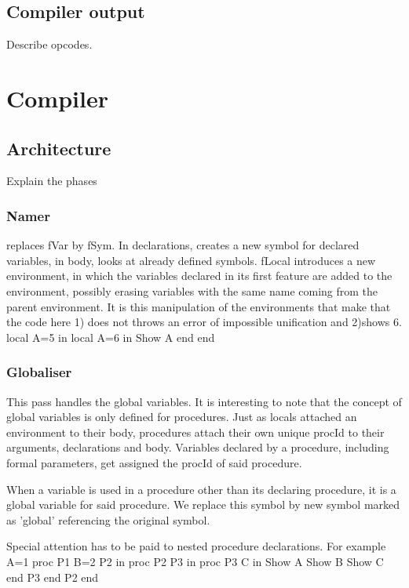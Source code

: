 \documentclass[draft,a4paper]{memoir}
\begin{document}
\section{Compiler output}
Describe opcodes.


\chapter{Compiler}
\section{Architecture}
Explain the phases
\subsection{Namer}
replaces fVar by fSym. In declarations, creates a new symbol for declared variables, in body, looks at already defined symbols.
fLocal introduces a new environment, in which the variables declared in its first feature are added to the environment, possibly erasing variables with the same name coming from the parent environment.
It is this manipulation of the environments that make that the code here 1) does not throws an error of impossible unification and 2)shows 6.
local
   A=5
in
   local 
      A=6
   in
      {Show A}
   end
end

\subsection{Globaliser}            
This pass handles the global variables. It is interesting to note that the concept of global variables is only defined for procedures.
Just as locals attached an environment to their body, procedures attach their own unique procId to their arguments, declarations and body.
Variables declared by a procedure, including formal parameters, get assigned the procId of said procedure.

When a variable is used in a procedure other than its declaring procedure, it is a global variable for said procedure. We replace this symbol by new symbol marked as 'global' referencing the original symbol.

Special attention has to be paid to nested procedure declarations. For example
A=1
proc {P1}                 %
   B=2
   P2
in
   proc {P2}              %
      P3 
   in
      proc {P3}           %
         C
      in
         {Show A}
         {Show B}
         {Show C}
      end
      {P3}
   end
   {P2}
end
\end{document}
